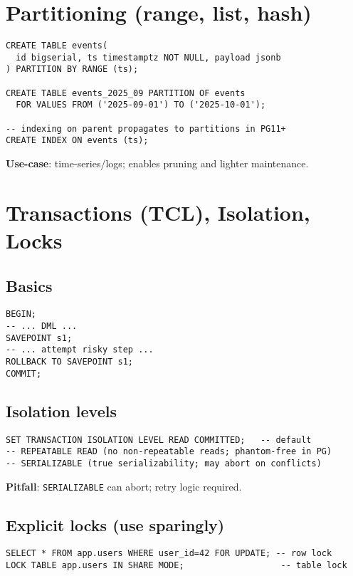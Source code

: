 \documentclass[10pt]{article}
\begin{document}
\section{Partitioning (range, list, hash)}
\begin{lstlisting}[style=psql]
CREATE TABLE events(
  id bigserial, ts timestamptz NOT NULL, payload jsonb
) PARTITION BY RANGE (ts);

CREATE TABLE events_2025_09 PARTITION OF events
  FOR VALUES FROM ('2025-09-01') TO ('2025-10-01');

-- indexing on parent propagates to partitions in PG11+
CREATE INDEX ON events (ts);
\end{lstlisting}
\textbf{Use-case}: time-series/logs; enables pruning and lighter maintenance.

\section{Transactions (TCL), Isolation, Locks}
\subsection{Basics}
\begin{lstlisting}[style=psql]
BEGIN;
-- ... DML ...
SAVEPOINT s1;
-- ... attempt risky step ...
ROLLBACK TO SAVEPOINT s1;
COMMIT;
\end{lstlisting}

\subsection{Isolation levels}
\begin{lstlisting}[style=psql]
SET TRANSACTION ISOLATION LEVEL READ COMMITTED;   -- default
-- REPEATABLE READ (no non-repeatable reads; phantom-free in PG)
-- SERIALIZABLE (true serializability; may abort on conflicts)
\end{lstlisting}
\textbf{Pitfall}: \texttt{SERIALIZABLE} can abort; retry logic required.

\subsection{Explicit locks (use sparingly)}
\begin{lstlisting}[style=psql]
SELECT * FROM app.users WHERE user_id=42 FOR UPDATE; -- row lock
LOCK TABLE app.users IN SHARE MODE;                   -- table lock
\end{lstlisting}
\end{document}
